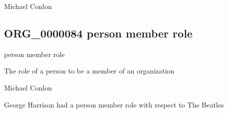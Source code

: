 \documentclass[letterpaper,10pt,english]{sphinxmanual}
\begin{document}
\begin{sphinxShadowBox}

\sphinxAtStartPar
Michael Conlon 
\end{sphinxShadowBox}
\begin{quote}

\ignorespaces \end{quote}


\subsection{ORG\_0000084 \sphinxhyphen{} person member role}
\label{\detokenize{doc-ORG_0000084:org-0000084-person-member-role}}\label{\detokenize{doc-ORG_0000084:index-0}}\label{\detokenize{doc-ORG_0000084::doc}}
\begin{sphinxShadowBox}

\sphinxAtStartPar
person member role
\end{sphinxShadowBox}

\begin{sphinxShadowBox}

\sphinxAtStartPar
{\hyperref[\detokenize{doc-BFO_0000023::doc}]{}}
\end{sphinxShadowBox}

\begin{sphinxShadowBox}

\sphinxAtStartPar
The role of a person to be a member of an organization
\end{sphinxShadowBox}

\begin{sphinxShadowBox}

\sphinxAtStartPar
Michael Conlon 
\end{sphinxShadowBox}

\begin{sphinxShadowBox}

\sphinxAtStartPar
George Harrison had a person member role with respect to The Beatles
\end{sphinxShadowBox}
\end{document}
